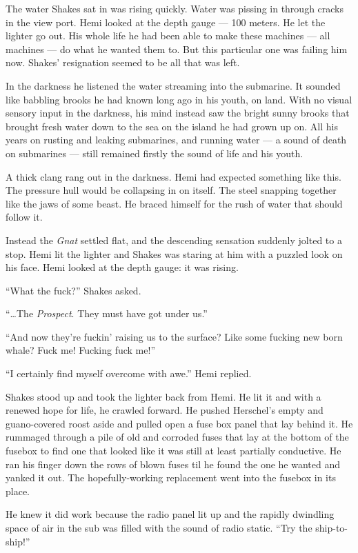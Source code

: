 \documentclass[]{scrbook}
\begin{document}
The water Shakes sat in was rising quickly. Water was pissing in through
cracks in the view port. Hemi looked at the depth gauge --- 100 meters.
He let the lighter go out. His whole life he had been able to make these
machines --- all machines --- do what he wanted them to. But this
particular one was failing him now. Shakes' resignation seemed to be all
that was left.

In the darkness he listened the water streaming into the submarine. It
sounded like babbling brooks he had known long ago in his youth, on
land. With no visual sensory input in the darkness, his mind instead saw
the bright sunny brooks that brought fresh water down to the sea on the
island he had grown up on. All his years on rusting and leaking
submarines, and running water --- a sound of death on submarines ---
still remained firstly the sound of life and his youth.

A thick clang rang out in the darkness. Hemi had expected something like
this. The pressure hull would be collapsing in on itself. The steel
snapping together like the jaws of some beast. He braced himself for the
rush of water that should follow it.

Instead the \emph{Gnat} settled flat, and the descending sensation
suddenly jolted to a stop. Hemi lit the lighter and Shakes was staring
at him with a puzzled look on his face. Hemi looked at the depth gauge:
it was rising.

``What the fuck?'' Shakes asked.

``\ldots{}The \emph{Prospect}. They must have got under us.''

``And now they're fuckin' raising us to the surface? Like some fucking
new born whale? Fuck me! Fucking fuck me!''

``I certainly find myself overcome with awe.'' Hemi replied.

Shakes stood up and took the lighter back from Hemi. He lit it and with
a renewed hope for life, he crawled forward. He pushed Herschel's empty
and guano-covered roost aside and pulled open a fuse box panel that lay
behind it. He rummaged through a pile of old and corroded fuses that lay
at the bottom of the fusebox to find one that looked like it was still
at least partially conductive. He ran his finger down the rows of blown
fuses til he found the one he wanted and yanked it out. The
hopefully-working replacement went into the fusebox in its place.

He knew it did work because the radio panel lit up and the rapidly
dwindling space of air in the sub was filled with the sound of radio
static. ``Try the ship-to-ship!''
\end{document}
